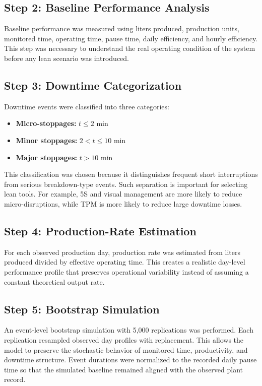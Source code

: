 \documentclass[12pt,a4paper]{article}
\begin{document}
\subsection{Step 2: Baseline Performance Analysis}
Baseline performance was measured using liters produced, production units, monitored time, operating time, pause time, daily efficiency, and hourly efficiency. This step was necessary to understand the real operating condition of the system before any lean scenario was introduced.

\subsection{Step 3: Downtime Categorization}
Downtime events were classified into three categories:
\begin{itemize}
    \item \textbf{Micro-stoppages:} $t \leq 2$ min
    \item \textbf{Minor stoppages:} $2 < t \leq 10$ min
    \item \textbf{Major stoppages:} $t > 10$ min
\end{itemize}

This classification was chosen because it distinguishes frequent short interruptions from serious breakdown-type events. Such separation is important for selecting lean tools. For example, 5S and visual management are more likely to reduce micro-disruptions, while TPM is more likely to reduce large downtime losses.

\subsection{Step 4: Production-Rate Estimation}
For each observed production day, production rate was estimated from liters produced divided by effective operating time. This creates a realistic day-level performance profile that preserves operational variability instead of assuming a constant theoretical output rate.

\subsection{Step 5: Bootstrap Simulation}
An event-level bootstrap simulation with 5,000 replications was performed. Each replication resampled observed day profiles with replacement. This allows the model to preserve the stochastic behavior of monitored time, productivity, and downtime structure. Event durations were normalized to the recorded daily pause time so that the simulated baseline remained aligned with the observed plant record.
\end{document}
